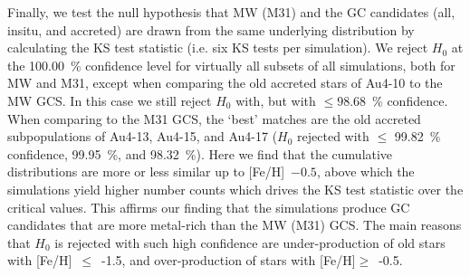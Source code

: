 \documentclass[a4paper,fleqn,usenatbib]{mnras}
\begin{document}
Finally, we test the null hypothesis that MW (M31) and the GC candidates (all, insitu, and
accreted) are drawn from the same underlying distribution by calculating the KS
test statistic (i.e. six KS tests per simulation). We reject $H_0$ at the 100.00~\%
confidence level for virtually all subsets of all simulations, both for MW and M31,
except when comparing the old accreted stars of \mbox{Au4-10} to the MW GCS. In this
case we still reject $H_0$ with, but with $\leq 98.68$~\% confidence. When comparing
to the M31 GCS, the `best' matches are the old accreted subpopulations of \mbox{Au4-13},
\mbox{Au4-15}, and \mbox{Au4-17} ($H_0$ rejected with $\leq$ 99.82~\% confidence, 99.95~\%,
and 98.32~\%). Here we find that the cumulative distributions are more or less
similar up to [Fe/H]~$-0.5$, above which the simulations yield higher number
counts which drives the KS test statistic over the critical values. This affirms
our finding that the simulations produce GC candidates that are more metal-rich
than the MW (M31) GCS. The main reasons that $H_0$ is rejected with such
high confidence are under-production of old stars with [Fe/H]~$\leq$~-1.5,
and over-production of stars with [Fe/H]$\geq$~-0.5.
\end{document}
